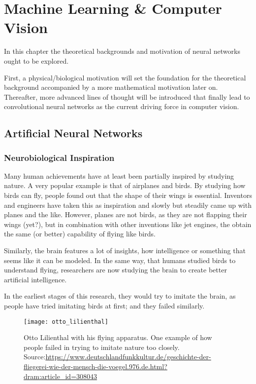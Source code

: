 \setchapterpreamble[u]{\margintoc}
\chapter{Machine Learning \& Computer Vision}
In this chapter the theoretical backgrounds and motivation of neural networks ought to be explored.

First, a physical/biological motivation will set the foundation for the theoretical background accompanied by a more mathematical motivation later on.
Thereafter, more advanced lines of thought will be introduced that finally lead to convolutional neural networks as the current driving force in computer vision.

\section{Artificial Neural Networks}

\subsection[Inspiration]{Neurobiological Inspiration}

Many human achievements have at least been partially inspired by studying nature.
A very popular example is that of airplanes and birds.
By studying how birds can fly, people found out that the shape of their wings is essential.
Inventors and engineers have taken this as inspiration and slowly but steadily came up with planes and the like.
However, planes are not birds, as they are not flapping their wings (yet?), but in combination with other inventions like jet engines, the obtain the same (or better) capability of flying like birds.

Similarly, the brain features a lot of insights, how intelligence or something that seems like it can be modeled.
In the same way, that humans studied birds to understand flying, researchers are now studying the brain to create better artificial intelligence.

In the earliest stages of this research, they would try to imitate the brain, as people have tried imitating birds at first; and they failed similarly.
\begin{figure}
    \texttt{[image: otto\_lilienthal]}
    \caption[]{Otto Lilienthal with his flying apparatus. One example of how people failed in trying to imitate nature too closely. Source:\url{https://www.deutschlandfunkkultur.de/geschichte-der-fliegerei-wie-der-mensch-die-voegel.976.de.html?dram:article_id=308043}}
\end{figure}

